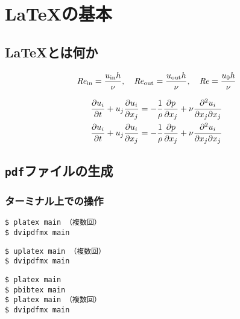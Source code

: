 \chapter{\LaTeX の基本}
\label{ch:basic}

\lipsum[1]

\section{\LaTeX とは何か}
\label{sec:whatislatex}

\begin{equation}
    \mathit{Re}_{\mathrm{in}} = \frac{u_{\mathrm{in}} h}{\nu}, \quad \mathit{Re}_{\mathrm{out}} = \frac{u_{\mathrm{out}} h}{\nu}, \quad \mathit{Re} = \frac{u_0 h}{\nu}
\end{equation}

\begin{align}
    \frac{\partial u_i}{\partial t} + u_j\frac{\partial u_i}{\partial x_j} &= - \frac{1}{\rho}\frac{\partial p}{\partial x_j} + \nu\frac{\partial^2 u_i}{\partial x_j \partial x_j} \\
    \pdv{u_i}{t} + u_j\pdv{u_i}{x_j} &= - \frac{1}{\rho}\pdv{p}{x_j} + \nu\pdv{u_i}{x_j}{x_j}
\end{align}

\section{\texttt{pdf}ファイルの生成}
\label{sec:makepdf}

\subsection{ターミナル上での操作}
\label{ssec:terminal}

\begin{tcolorbox}[enhanced, title=\pLaTeX, drop fuzzy shadow]
\begin{verbatim}
$ platex main （複数回）
$ dvipdfmx main
\end{verbatim}
\end{tcolorbox}


\begin{tcolorbox}[enhanced, title=\upLaTeX, drop fuzzy shadow]
\begin{verbatim}
$ uplatex main （複数回）
$ dvipdfmx main
\end{verbatim}
\end{tcolorbox}


\begin{tcolorbox}[enhanced, title=\pLaTeX$+$\pBibTeX, drop fuzzy shadow]
\begin{verbatim}
$ platex main
$ pbibtex main
$ platex main （複数回）
$ dvipdfmx main
\end{verbatim}
\end{tcolorbox}


